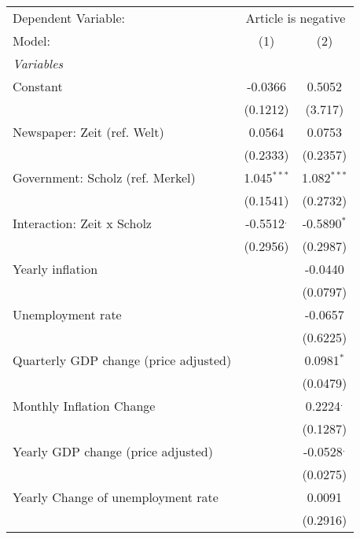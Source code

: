 
\begingroup
\centering
\begin{tabular}{lcc}
   \tabularnewline \midrule \midrule
   Dependent Variable: & \multicolumn{2}{c}{Article is negative}\\
   Model:                                & (1)           & (2)\\  
   \midrule
   \emph{Variables}\\
   Constant                              & -0.0366       & 0.5052\\   
                                         & (0.1212)      & (3.717)\\   
   Newspaper: Zeit (ref. Welt)           & 0.0564        & 0.0753\\   
                                         & (0.2333)      & (0.2357)\\   
   Government: Scholz (ref. Merkel)      & 1.045$^{***}$ & 1.082$^{***}$\\   
                                         & (0.1541)      & (0.2732)\\   
   Interaction: Zeit x Scholz            & -0.5512$^{.}$ & -0.5890$^{*}$\\   
                                         & (0.2956)      & (0.2987)\\   
   Yearly inflation                      &               & -0.0440\\   
                                         &               & (0.0797)\\   
   Unemployment rate                     &               & -0.0657\\   
                                         &               & (0.6225)\\   
   Quarterly GDP change (price adjusted) &               & 0.0981$^{*}$\\   
                                         &               & (0.0479)\\   
   Monthly Inflation Change              &               & 0.2224$^{.}$\\   
                                         &               & (0.1287)\\   
   Yearly GDP change (price adjusted)    &               & -0.0528$^{.}$\\   
                                         &               & (0.0275)\\   
   Yearly Change of unemployment rate    &               & 0.0091\\   
                                         &               & (0.2916)\\   

\end{tabular}
